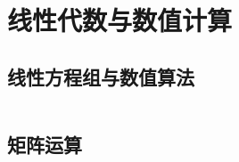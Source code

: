\chapter{线性代数与数值计算}

\section{线性方程组与数值算法}

\inputminted{cpp}{code/LinearAlgebraAndNumerical/LinearEquationsAndProgram.cpp}

\section{矩阵运算}

\inputminted{cpp}{code/LinearAlgebraAndNumerical/Matrix.cpp}
